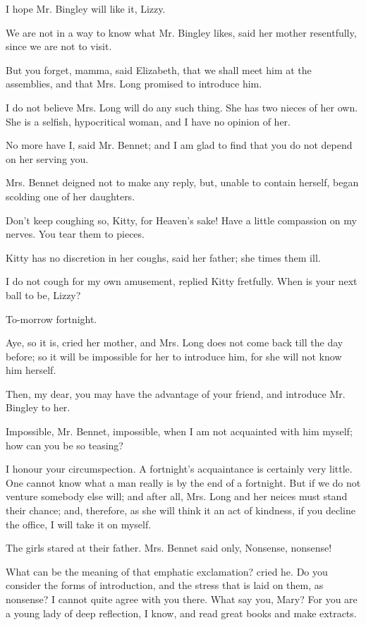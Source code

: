 \documentclass[DIV=6]{scrartcl}
\begin{document}
I hope Mr. Bingley will like it, Lizzy.

We are not in a way to know what Mr. Bingley likes, said her mother
resentfully, since we are not to visit.

But you forget, mamma, said Elizabeth, that we shall meet him at the
assemblies, and that Mrs. Long promised to introduce him.

I do not believe Mrs. Long will do any such thing. She has two nieces
of her own. She is a selfish, hypocritical woman, and I have no opinion
of her.

No more have I, said Mr. Bennet; and I am glad to find that you do
not depend on her serving you.

Mrs. Bennet deigned not to make any reply, but, unable to contain
herself, began scolding one of her daughters.

Don't keep coughing so, Kitty, for Heaven's sake! Have a little
compassion on my nerves. You tear them to pieces.

Kitty has no discretion in her coughs, said her father; she times
them ill.

I do not cough for my own amusement, replied Kitty fretfully. When is
your next ball to be, Lizzy?

To-morrow fortnight.

Aye, so it is, cried her mother, and Mrs. Long does not come back
till the day before; so it will be impossible for her to introduce him,
for she will not know him herself.

Then, my dear, you may have the advantage of your friend, and introduce
Mr. Bingley to her.

Impossible, Mr. Bennet, impossible, when I am not acquainted with him
myself; how can you be so teasing?

I honour your circumspection. A fortnight's acquaintance is certainly
very little. One cannot know what a man really is by the end of a
fortnight. But if we do not venture somebody else will; and after all,
Mrs. Long and her neices must stand their chance; and, therefore, as
she will think it an act of kindness, if you decline the office, I will
take it on myself.

The girls stared at their father. Mrs. Bennet said only, Nonsense,
nonsense!

What can be the meaning of that emphatic exclamation? cried he. Do
you consider the forms of introduction, and the stress that is laid on
them, as nonsense? I cannot quite agree with you there. What say you,
Mary? For you are a young lady of deep reflection, I know, and read
great books and make extracts.
\end{document}
